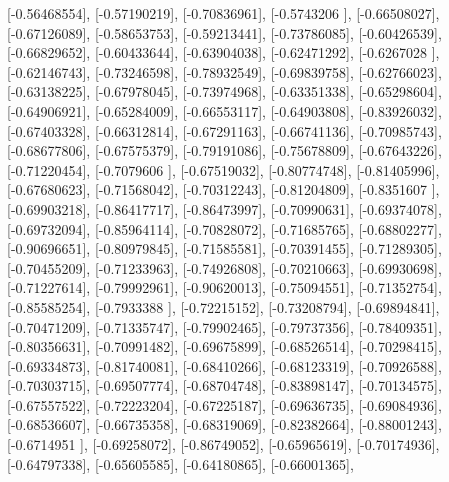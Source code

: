 \documentclass{article}
\begin{document}
       [-0.56468554],
       [-0.57190219],
       [-0.70836961],
       [-0.5743206 ],
       [-0.66508027],
       [-0.67126089],
       [-0.58653753],
       [-0.59213441],
       [-0.73786085],
       [-0.60426539],
       [-0.66829652],
       [-0.60433644],
       [-0.63904038],
       [-0.62471292],
       [-0.6267028 ],
       [-0.62146743],
       [-0.73246598],
       [-0.78932549],
       [-0.69839758],
       [-0.62766023],
       [-0.63138225],
       [-0.67978045],
       [-0.73974968],
       [-0.63351338],
       [-0.65298604],
       [-0.64906921],
       [-0.65284009],
       [-0.66553117],
       [-0.64903808],
       [-0.83926032],
       [-0.67403328],
       [-0.66312814],
       [-0.67291163],
       [-0.66741136],
       [-0.70985743],
       [-0.68677806],
       [-0.67575379],
       [-0.79191086],
       [-0.75678809],
       [-0.67643226],
       [-0.71220454],
       [-0.7079606 ],
       [-0.67519032],
       [-0.80774748],
       [-0.81405996],
       [-0.67680623],
       [-0.71568042],
       [-0.70312243],
       [-0.81204809],
       [-0.8351607 ],
       [-0.69903218],
       [-0.86417717],
       [-0.86473997],
       [-0.70990631],
       [-0.69374078],
       [-0.69732094],
       [-0.85964114],
       [-0.70828072],
       [-0.71685765],
       [-0.68802277],
       [-0.90696651],
       [-0.80979845],
       [-0.71585581],
       [-0.70391455],
       [-0.71289305],
       [-0.70455209],
       [-0.71233963],
       [-0.74926808],
       [-0.70210663],
       [-0.69930698],
       [-0.71227614],
       [-0.79992961],
       [-0.90620013],
       [-0.75094551],
       [-0.71352754],
       [-0.85585254],
       [-0.7933388 ],
       [-0.72215152],
       [-0.73208794],
       [-0.69894841],
       [-0.70471209],
       [-0.71335747],
       [-0.79902465],
       [-0.79737356],
       [-0.78409351],
       [-0.80356631],
       [-0.70991482],
       [-0.69675899],
       [-0.68526514],
       [-0.70298415],
       [-0.69334873],
       [-0.81740081],
       [-0.68410266],
       [-0.68123319],
       [-0.70926588],
       [-0.70303715],
       [-0.69507774],
       [-0.68704748],
       [-0.83898147],
       [-0.70134575],
       [-0.67557522],
       [-0.72223204],
       [-0.67225187],
       [-0.69636735],
       [-0.69084936],
       [-0.68536607],
       [-0.66735358],
       [-0.68319069],
       [-0.82382664],
       [-0.88001243],
       [-0.6714951 ],
       [-0.69258072],
       [-0.86749052],
       [-0.65965619],
       [-0.70174936],
       [-0.64797338],
       [-0.65605585],
       [-0.64180865],
       [-0.66001365],
\end{document}
